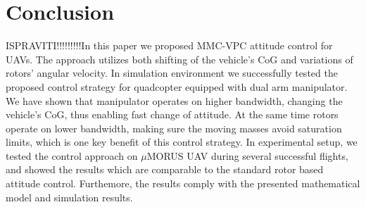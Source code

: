 \section{Conclusion}
ISPRAVITI!!!!!!!!!In this paper we proposed MMC-VPC attitude control for UAVs. The approach utilizes both shifting of the vehicle's CoG and variations of rotors' angular velocity. In simulation environment we successfully tested the proposed control strategy for quadcopter equipped with dual arm manipulator. We have shown that manipulator operates on higher bandwidth, changing the vehicle's CoG, thus enabling fast change of attitude. At the same time rotors operate on lower bandwidth, making sure the moving masses avoid saturation limits, which is one key benefit of this control strategy. In experimental setup, we tested the control approach on $\mu$MORUS UAV during several successful flights, and showed the results which are comparable to the standard rotor based attitude control. Furthemore, the results comply with the presented mathematical model and simulation results.